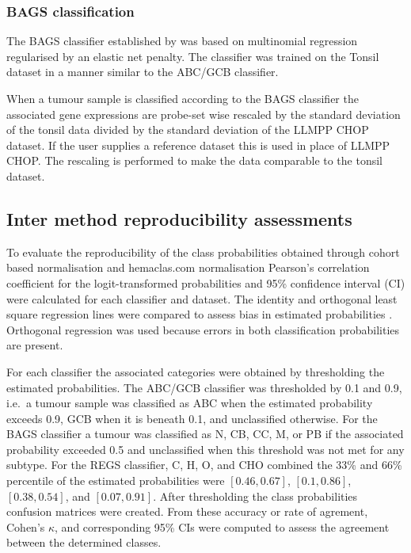 \documentclass{article}
\begin{document}
\subsubsection{BAGS classification}
The BAGS classifier established by \citet{Dybkaer2013} was based on multinomial regression regularised by an elastic net penalty.
The classifier was trained on the Tonsil dataset in a manner similar to the ABC/GCB classifier.

When a tumour sample is classified according to the BAGS classifier the associated gene expressions are probe-set wise rescaled by the standard deviation of the tonsil data divided by the standard deviation of the LLMPP CHOP dataset.
If the user supplies a reference dataset this is used in place of LLMPP CHOP.
The rescaling is performed to make the data comparable to the tonsil dataset.


\subsection{Inter method reproducibility assessments}
To evaluate the reproducibility of the class probabilities obtained through cohort based normalisation and hemaclas.com normalisation Pearson's correlation coefficient for the logit-transformed probabilities and 95\% confidence interval (CI) were calculated for each classifier and dataset.
The identity and orthogonal least square regression lines were compared to assess bias in estimated probabilities \citep{CHEN1989}.
Orthogonal regression was used because errors in both classification probabilities are present.

For each classifier the associated categories were obtained by thresholding the estimated probabilities.
The ABC/GCB classifier was thresholded by 0.1 and 0.9, i.e.\ a tumour sample was classified as ABC when the estimated probability exceeds 0.9, GCB when it is beneath 0.1, and unclassified otherwise.
For the BAGS classifier a tumour was classified as N, CB, CC, M, or PB if the associated probability exceeded 0.5 and unclassified when this threshold was not met for any subtype.
For the REGS classifier, C, H, O, and CHO combined the 33\% and 66\% percentile of the estimated probabilities were $[0.46, 0.67]$, $[0.1, 0.86]$, $[0.38, 0.54]$, and $[0.07, 0.91]$.
After thresholding the class probabilities confusion matrices were created.
From these accuracy or rate of agrement, Cohen's $\kappa$, and corresponding 95\% CIs were computed to assess the agreement between the determined classes.
\end{document}
